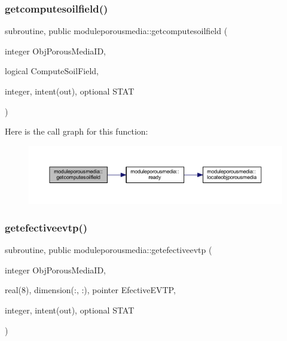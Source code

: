 \subsubsection{\texorpdfstring{getcomputesoilfield()}{getcomputesoilfield()}}
{\footnotesize\ttfamily subroutine, public moduleporousmedia\+::getcomputesoilfield (\begin{DoxyParamCaption}\item[{integer}]{Obj\+Porous\+Media\+ID,  }\item[{logical}]{Compute\+Soil\+Field,  }\item[{integer, intent(out), optional}]{S\+T\+AT }\end{DoxyParamCaption})}

Here is the call graph for this function\+:\nopagebreak
\begin{figure}[H]
\begin{center}
\leavevmode
\includegraphics[width=350pt]{namespacemoduleporousmedia_ae3c2ce61a7783cf1653e19109914fe29_cgraph}
\end{center}
\end{figure}
\mbox{\label{namespacemoduleporousmedia_a2706d0d1284873eb1538b17e9b347d9a}} 
\subsubsection{\texorpdfstring{getefectiveevtp()}{getefectiveevtp()}}
{\footnotesize\ttfamily subroutine, public moduleporousmedia\+::getefectiveevtp (\begin{DoxyParamCaption}\item[{integer}]{Obj\+Porous\+Media\+ID,  }\item[{real(8), dimension(\+:, \+:), pointer}]{Efective\+E\+V\+TP,  }\item[{integer, intent(out), optional}]{S\+T\+AT }\end{DoxyParamCaption})}


